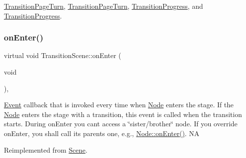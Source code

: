 \hyperlink{classTransitionPageTurn_adb15cf19b760250156d6fa3f2e1dbf31}{Transition\+Page\+Turn}, \hyperlink{classTransitionPageTurn_a451cf478d1f344678dde975e0db39b46}{Transition\+Page\+Turn}, \hyperlink{classTransitionProgress_aa3ccb7515691f10b5410b75d912e2b68}{Transition\+Progress}, and \hyperlink{classTransitionProgress_a4bb6172fb74abe0a0a0de2a3742a9cf6}{Transition\+Progress}.

\mbox{\label{classTransitionScene_a9093cbd324910ea7c9e3955317f7b661}} 
\subsubsection{\texorpdfstring{on\+Enter()}{onEnter()}\hspace{0.1cm}{\footnotesize\ttfamily [2/2]}}
{\footnotesize\ttfamily virtual void Transition\+Scene\+::on\+Enter (\begin{DoxyParamCaption}\item[{void}]{ }\end{DoxyParamCaption})\hspace{0.3cm}{\ttfamily [override]}, {\ttfamily [virtual]}}

\hyperlink{classEvent}{Event} callback that is invoked every time when \hyperlink{classNode}{Node} enters the \textquotesingle{}stage\textquotesingle{}. If the \hyperlink{classNode}{Node} enters the \textquotesingle{}stage\textquotesingle{} with a transition, this event is called when the transition starts. During on\+Enter you can\textquotesingle{}t access a \char`\"{}sister/brother\char`\"{} node. If you override on\+Enter, you shall call its parent\textquotesingle{}s one, e.\+g., \hyperlink{classNode_a7f51764c4afd5018a052b9ef71c03374}{Node\+::on\+Enter()}.  NA 

Reimplemented from \hyperlink{classScene_a0f685cac49f90456c69f1b03aa5c8674}{Scene}.




